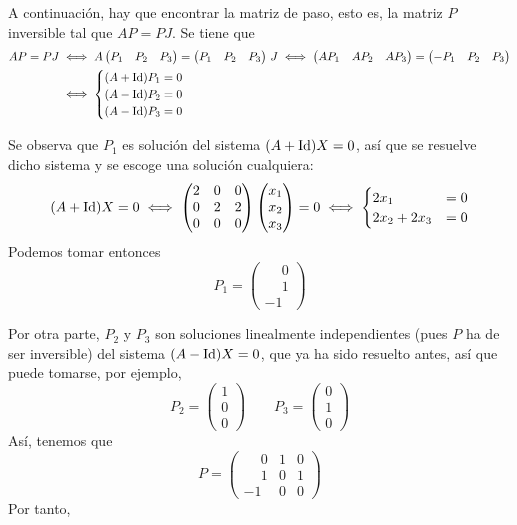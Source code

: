 \documentclass[11pt]{report}
\begin{document}
A continuación, hay que encontrar la matriz de paso, esto es, la matriz $P$ inversible tal que $AP=PJ$. Se tiene que
\[\begin{aligned}[t]
    AP=PJ &\iff A\begin{pmatrix}
        P_1 & P_2 & P_3
    \end{pmatrix} = \begin{pmatrix}
        P_1 & P_2 & P_3
    \end{pmatrix} \, J \iff \begin{pmatrix}
        AP_1 & AP_2 & AP_3
    \end{pmatrix} = \begin{pmatrix}
        -P_1 & P_2 & P_3
    \end{pmatrix} \\
    &\iff \begin{cases}
        (A+\textup{Id})P_1=0 \\
        (A-\textup{Id})P_2=0 \\
        (A-\textup{Id})P_3=0
    \end{cases}
\end{aligned}\]

Se observa que $P_1$ es solución del sistema $(A+\textup{Id})X=0$, así que se resuelve dicho sistema y se escoge una solución cualquiera:
\[(A+\textup{Id})X=0 \iff \begin{pmatrix}
    2 & 0 & 0 \\
    0 & 2 & 2 \\
    0 & 0 & 0
\end{pmatrix}\begin{pmatrix}
    x_1 \\
    x_2 \\
    x_3
\end{pmatrix}=0 \iff \begin{cases}
    2x_1&=0 \\
    2x_2+2x_3&=0
\end{cases}\]
Podemos tomar entonces
\[P_1=\begin{pmatrix}
    \phantom{-}0 \\
    \phantom{-}1 \\
    -1
\end{pmatrix}\]

Por otra parte, $P_2$ y $P_3$ son soluciones linealmente independientes (pues $P$ ha de ser inversible) del sistema $(A-\textup{Id})X=0$, que ya ha sido resuelto antes, así que puede tomarse, por ejemplo,
\[P_2=\begin{pmatrix}
    1 \\
    0 \\
    0
\end{pmatrix} \qquad P_3=\begin{pmatrix}
    0 \\
    1 \\
    0
\end{pmatrix}\]
Así, tenemos que
\[P=\begin{pmatrix}
    \phantom{-}0 & 1 & 0 \\
    \phantom{-}1 & 0 & 1 \\
    -1 & 0 & 0
\end{pmatrix}\]
Por tanto,
\end{document}

